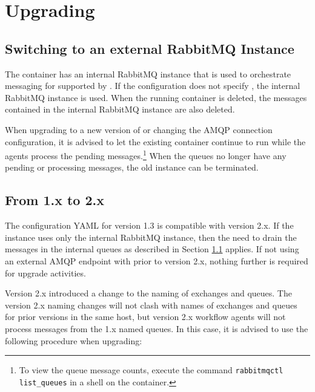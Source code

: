\chapter{Upgrading}

\section{Switching to an external RabbitMQ Instance}\label{sec:rmq-switch}

The \cxoneflow container has an internal RabbitMQ instance that is used to orchestrate messaging 
for  supported by \cxoneflow.  If the configuration
does not specify , the internal RabbitMQ instance
is used.  When the running \cxoneflow container is deleted, the messages contained in the internal
RabbitMQ instance are also deleted.

When upgrading to a new version of \cxoneflow or changing the AMQP connection configuration, it is advised
to let the existing \cxoneflow container continue to run while the agents process the pending messages.\footnote{To view 
the queue message counts, execute the command \texttt{rabbitmqctl list\_queues} in a shell on the \cxoneflow container.}  
When the queues no longer have any pending or processing messages, the old \cxoneflow instance can be terminated.

\section{From 1.x to 2.x}

The configuration YAML for version 1.3 is compatible with version 2.x.  If the \cxoneflow instance uses only the internal
RabbitMQ instance, then the need to drain the messages in the internal queues as described in Section \ref{sec:rmq-switch}
applies.  If not using an external AMQP endpoint with \cxoneflow prior to version 2.x, nothing further is required for 
upgrade activities.

Version 2.x introduced a change to the naming of exchanges and queues.  The version 2.x naming changes will not clash with
names of exchanges and queues for prior versions in the same host, but version 2.x workflow agents will not process messages
from the 1.x named queues.  In this case, it is advised to use the following procedure when upgrading:


